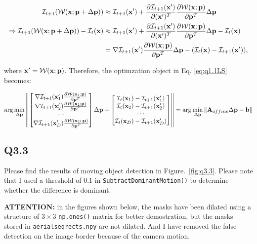 \documentclass[11pt]{article}
\newcommand{\code}[1]{\texttt{#1}}
\begin{document}
\begin{align} \label{general_warping_expansion}
    \mathcal{I}_{t+1}(\mathcal{W}(\mathbf{x};\mathbf{p}+\Delta \mathbf{p}))
    & \approx
    \mathcal{I}_{t+1}(\mathbf{x}')+
    \frac{\partial \mathcal{I}_{t+1}(\mathbf{x}')}{\partial(\mathbf{x}')^T}
    \frac{\partial \mathcal{W}(\mathbf{x}; \mathbf{p})} {\partial \mathbf{p}^T} \Delta \mathbf{p}
    \\ \Rightarrow
    \mathcal{I}_{t+1}(\mathcal{W}(\mathbf{x};\mathbf{p}+\Delta \mathbf{p})) - \mathcal{I}_t(\mathbf{x})
    & \approx
    \mathcal{I}_{t+1} (\mathbf{x}') +
    \frac {\partial \mathcal{I}_{t+1}(\mathbf{x}')} {\partial(\mathbf{x}')^T}
    \frac{\partial \mathcal{W}(\mathbf{x}; \mathbf{p})} {\partial \mathbf{p}^T}
    \Delta \mathbf{p} - \mathcal{I}_t(\mathbf{x}) \\
    &= \nabla \mathcal{I}_{t+1}(\mathbf{x}')
    \frac{\partial \mathcal{W}(\mathbf{x}; \mathbf{p})} {\partial \mathbf{p}^T}
    \Delta \mathbf{p} - (\mathcal{I}_t(\mathbf{x}) - \mathcal{I}_{t+1} (\mathbf{x}')),
\end{align}

where $\mathbf{x}'=\mathcal{W}(\mathbf{x};\mathbf{p})$. Therefore, the optimzation object in Eq. \ref{eq:q1.1LS} becomes:

\begin{equation} \label{general_optimization_object}
    \arg\min_{\Delta \mathbf{p}}
    \left \|
    \begin{bmatrix}
        \nabla \mathcal{I}_{t+1}(\mathbf{x}_1') \frac{\partial\mathcal{W}(\mathbf{x}_1;\mathbf{p})}{\partial \mathbf{p}^T} \\
        \nabla \mathcal{I}_{t+1}(\mathbf{x}_2') \frac{\partial\mathcal{W}(\mathbf{x}_2;\mathbf{p})}{\partial \mathbf{p}^T} \\
        \cdots\\
        \nabla \mathcal{I}_{t+1}(\mathbf{x}_D') \frac{\partial\mathcal{W}(\mathbf{x}_D;\mathbf{p})}{\partial \mathbf{p}^T}
    \end{bmatrix}
    \Delta \mathbf{p} -
    \begin{bmatrix}
        \mathcal{I}_t(\mathbf{x}_1) - \mathcal{I}_{t+1} (\mathbf{x}_1')\\
        \mathcal{I}_t(\mathbf{x}_2) - \mathcal{I}_{t+1} (\mathbf{x}_2')\\
        \cdots\\
        \mathcal{I}_t(\mathbf{x}_D) - \mathcal{I}_{t+1} (\mathbf{x}_D')\\
    \end{bmatrix}
    \right \|
    =
    \arg\min_{\Delta \mathbf{p}}
    \| \mathbf{A}_{affine}\Delta\mathbf{p} - \mathbf{b} \|
\end{equation}

\newpage
\subsection*{Q3.3}

Please find the results of moving object detection in Figure.~\ref{fig:q3.3}. Please note that I used a threshold of $0.1$ in \code{SubtractDominantMotion()} to determine whether the difference is dominant.

\textbf{ATTENTION:} in the figures shown below, the masks have been dilated using a structure of $3\times3$ \code{np.ones()} matrix for better demostration, but the masks stored in \code{aerialseqrects.npy} are not dilated. And I have removed the false detection on the image border because of the camera motion. 
\end{document}
